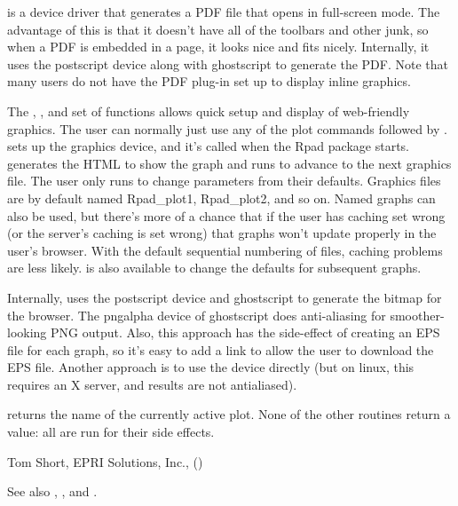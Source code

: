 \begin{Details}\relax
{} is a device driver that generates a PDF file that opens in
full-screen mode. The advantage of this is that it doesn't have all of
the toolbars and other junk, so when a PDF is embedded in a page, it
looks nice and fits nicely. Internally, it uses the postscript device
along with ghostscript to generate the PDF. Note that many users do not
have the PDF plug-in set up to display inline graphics.

The , , and  set of functions
allows quick setup and display of web-friendly graphics. The user can
normally just use any of the plot commands followed by
.  sets up the graphics
device, and it's called when the Rpad package
starts.  generates the HTML to show the graph and runs
 to advance
to the next graphics file. The user only runs  to change
parameters from their defaults. Graphics files are by default named
Rpad\_plot1, Rpad\_plot2, and so on. Named graphs can also be used, but
there's more of a chance that if the user has caching set wrong (or the
server's caching is set wrong) that graphs won't update properly in the
user's browser. With the default sequential numbering of files, caching
problems are less likely.  is also available to change the
defaults for subsequent graphs.

Internally,  uses the postscript device and ghostscript
to generate the bitmap for the browser. The pngalpha device of
ghostscript does
anti-aliasing for smoother-looking PNG output. Also, this approach has the
side-effect of creating an EPS file for each graph, so it's easy to add
a link to allow the user to download the EPS file. Another approach is to
use the  device directly (but on linux, this requires an X
server, and results are not antialiased).
\end{Details}
\begin{Value}
 returns the name of the currently active
plot. None of the other routines return a value: all are run for their
side effects.
\end{Value}
\begin{Author}\relax
Tom Short, EPRI Solutions, Inc., ()
\end{Author}
\begin{SeeAlso}\relax
See also , , and .
\end{SeeAlso}
